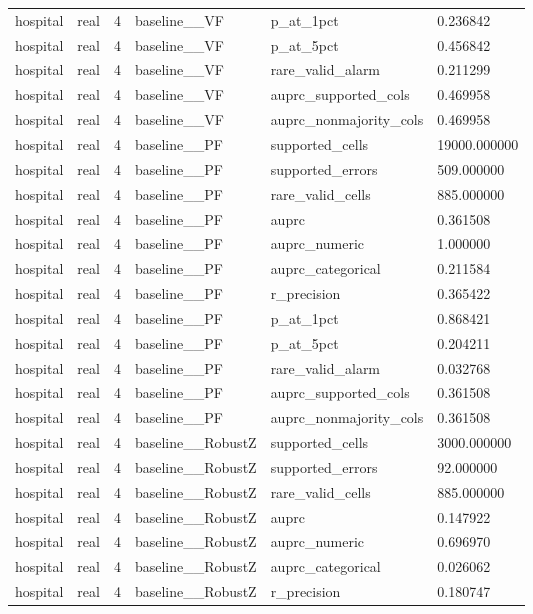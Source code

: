 \begin{tabular}{llllll}
hospital & real & 4 & baseline\_\_VF & p\_at\_1pct & 0.236842 \\
hospital & real & 4 & baseline\_\_VF & p\_at\_5pct & 0.456842 \\
hospital & real & 4 & baseline\_\_VF & rare\_valid\_alarm & 0.211299 \\
hospital & real & 4 & baseline\_\_VF & auprc\_supported\_cols & 0.469958 \\
hospital & real & 4 & baseline\_\_VF & auprc\_nonmajority\_cols & 0.469958 \\
hospital & real & 4 & baseline\_\_PF & supported\_cells & 19000.000000 \\
hospital & real & 4 & baseline\_\_PF & supported\_errors & 509.000000 \\
hospital & real & 4 & baseline\_\_PF & rare\_valid\_cells & 885.000000 \\
hospital & real & 4 & baseline\_\_PF & auprc & 0.361508 \\
hospital & real & 4 & baseline\_\_PF & auprc\_numeric & 1.000000 \\
hospital & real & 4 & baseline\_\_PF & auprc\_categorical & 0.211584 \\
hospital & real & 4 & baseline\_\_PF & r\_precision & 0.365422 \\
hospital & real & 4 & baseline\_\_PF & p\_at\_1pct & 0.868421 \\
hospital & real & 4 & baseline\_\_PF & p\_at\_5pct & 0.204211 \\
hospital & real & 4 & baseline\_\_PF & rare\_valid\_alarm & 0.032768 \\
hospital & real & 4 & baseline\_\_PF & auprc\_supported\_cols & 0.361508 \\
hospital & real & 4 & baseline\_\_PF & auprc\_nonmajority\_cols & 0.361508 \\
hospital & real & 4 & baseline\_\_RobustZ & supported\_cells & 3000.000000 \\
hospital & real & 4 & baseline\_\_RobustZ & supported\_errors & 92.000000 \\
hospital & real & 4 & baseline\_\_RobustZ & rare\_valid\_cells & 885.000000 \\
hospital & real & 4 & baseline\_\_RobustZ & auprc & 0.147922 \\
hospital & real & 4 & baseline\_\_RobustZ & auprc\_numeric & 0.696970 \\
hospital & real & 4 & baseline\_\_RobustZ & auprc\_categorical & 0.026062 \\
hospital & real & 4 & baseline\_\_RobustZ & r\_precision & 0.180747 \\

\end{tabular}
